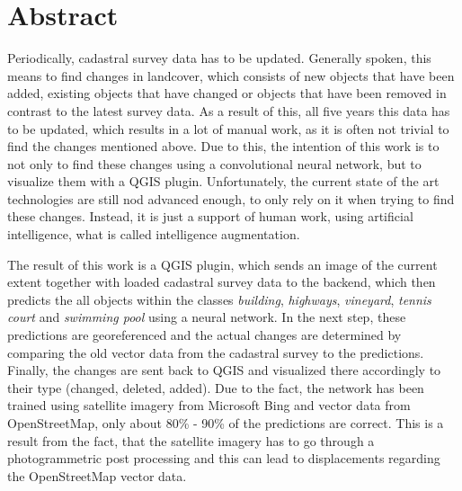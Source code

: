 \cleardoublepage
\markleft{\abstractname}

\chapter*{Abstract}
Periodically, cadastral survey data has to be updated. Generally spoken, this means  to find changes in landcover, which consists of new objects that have been added, existing objects that have changed or objects that have been removed in contrast to the latest survey data. As a result of this, all five years this data has to be updated, which results in a lot of manual work, as it is often not trivial to find the changes mentioned above. Due to this, the intention of this work is to not only to find these changes using a convolutional neural network, but to visualize them with a QGIS plugin. Unfortunately, the current state of the art technologies are still nod advanced enough, to only rely on it when trying to find these changes. Instead, it is just a support of human work, using artificial intelligence, what is called intelligence augmentation.

The result of this work is a QGIS plugin, which sends an image of the current extent together with loaded cadastral survey data to the backend, which then predicts the all objects within the classes \textit{building}, \textit{highways}, \textit{vineyard}, \textit{tennis court} and \textit{swimming pool} using a neural network. In the next step, these predictions are georeferenced and the actual changes are determined by comparing the old vector data from the cadastral survey to the predictions. Finally, the changes are sent back to QGIS and visualized there accordingly to their type (changed, deleted, added). Due to the fact, the network has been trained using satellite imagery from Microsoft Bing and vector data from OpenStreetMap, only about 80\% - 90\% of the predictions are correct. This is a result from the fact, that the satellite imagery has to go through a photogrammetric post processing and this can lead to displacements regarding the OpenStreetMap vector data.